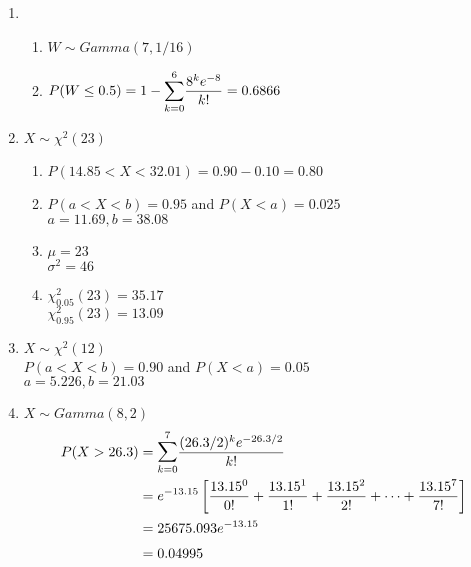 \documentclass{article}
\begin{document}
\begin{enumerate}
     \item
      \begin{enumerate}
       \item 
	$W \sim Gamma(7, 1/16)$
	
       \item
	$P(W \le 0.5) = 1 - \mathlarger{\sum}_{k=0}^{6}{\dfrac{8^k e^{-8}}{k!}} = 0.6866$
      \end{enumerate}
     
     \item
      $X \sim \chi^2(23)$
      \begin{enumerate}
       \item 
	$P(14.85 < X < 32.01) = 0.90 - 0.10 = 0.80$

       \item
	$P(a < X < b) = 0.95$ and $P(X < a) = 0.025$\\
	$a = 11.69, b = 38.08$
       
       \item
	$\mu = 23$ \\
	$\sigma^2 = 46$
       
       \item
	$\chi_{0.05}^2(23) = 35.17$ \\
	$\chi_{0.95}^2(23) = 13.09$
      \end{enumerate}
     
     \item
      $X \sim \chi^2(12)$ \\
      $P(a < X < b) = 0.90$ and $P(X < a) = 0.05$ \\
      $a = 5.226, b = 21.03$
     \addtocounter{enumi}{1}
     
     \item
      $X \sim Gamma(8, 2)$ 
	\begin{align*}
	  P(X > 26.3) &= \mathlarger{\sum}_{k=0}^7 {\dfrac{(26.3/2)^k e^{-26.3/2}}{k!}} \\
	    &= e^{-13.15} \left[ \dfrac{13.15^0}{0!} + \dfrac{13.15^1}{1!} + \dfrac{13.15^2}{2!} 
	      + \cdots + \dfrac{13.15^7}{7!} \right] \\
	    &= 25675.093e^{-13.15} \\
	    &= 0.04995
	\end{align*}
     \addtocounter{enumi}{3}
     

\end{enumerate}
\end{document}
